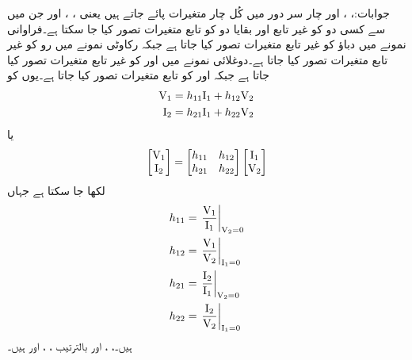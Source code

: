 جوابات:، ،  اور 
چار سر دور میں کُل چار متغیرات پائے جاتے ہیں یعنی ، ،  اور  جن میں سے کسی دو کو غیر تابع اور بقایا دو کو تابع متغیرات تصور کیا جا سکتا ہے۔فراوانی نمونے  میں دباؤ کو غیر تابع متغیرات تصور کیا جاتا ہے جبکہ رکاوٹی  نمونے میں رو کو غیر تابع متغیرات تصور کیا جاتا ہے۔دوغلائی نمونے میں  اور  کو غیر تابع متغیرات تصور کیا جاتا ہے جبکہ  اور  کو تابع متغیرات تصور کیا جاتا ہے۔یوں  کو
\begin{gather}
\begin{aligned}\label{مساوات_چار_سر_دوغلائی_مساوی_الف}
{\ensuremath{{\textup{V}}}}_1&=h_{11} {{\textup{I}}}_1+h_{12}{{\textup{V}}}_2\\
{{\textup{I}}}_2&=h_{21}{{\textup{I}}}_1+h_{22}{{\textup{V}}}_2
\end{aligned}
\end{gather}
یا
\begin{align}
\begin{bmatrix}
{\ensuremath{{\textup{V}}}}_1\\
{{\textup{I}}}_2
\end{bmatrix}
=
\begin{bmatrix}
h_{11} & h_{12}\\
h_{21} & h_{22}
\end{bmatrix}
\begin{bmatrix}
{\ensuremath{{\textup{I}}}}_1\\
{{\textup{V}}}_2
\end{bmatrix}
\end{align}
لکھا جا سکتا ہے جہاں
\begin{gather}
\begin{aligned}
h_{11}&=\left. \frac{{{\textup{V}}}_1}{{{\textup{I}}}_1}\right|_{{{\textup{V}}}_2=0}\\
h_{12}&=\left. \frac{{{\textup{V}}}_1}{{{\textup{V}}}_2}\right|_{{{\textup{I}}}_1=0}\\
h_{21}&=\left. \frac{{{\textup{I}}}_2}{{{\textup{I}}}_1}\right|_{{{\textup{V}}}_2=0}\\
h_{22}&=\left. \frac{{{\textup{I}}}_2}{{{\textup{V}}}_2}\right|_{{{\textup{I}}}_1=0}
\end{aligned}
\end{gather}
ہیں۔، ،  اور  بالترتیب ، ،  اور  ہیں۔ 

